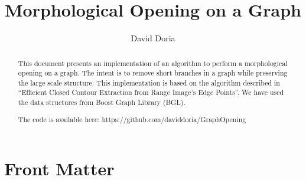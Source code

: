 \documentclass{ComputationalAlgorithmsArticle}
\title{Morphological Opening on a Graph}
\author{David Doria}
\newcommand{\IJhandlerIDnumber}{3250}
\begin{document}
\IJhandlefooter{\IJhandlerIDnumber}


\ifpdf
\else
\fi


\maketitle

\ifhtml
\chapter*{Front Matter\label{front}}
\fi

\begin{abstract}
\noindent

This document presents an implementation of an algorithm to perform a morphological opening on a graph. The intent is to remove short branches in a graph while preserving the large scale structure. This implementation is based on the algorithm described in ``Efficient Closed Contour Extraction from Range Image's Edge Points''. We have used the data structures from Boost Graph Library (BGL).

The code is available here:
https://github.com/daviddoria/GraphOpening

\end{abstract}

\logo
\IJhandlenote{\IJhandlerIDnumber}
\end{document}

